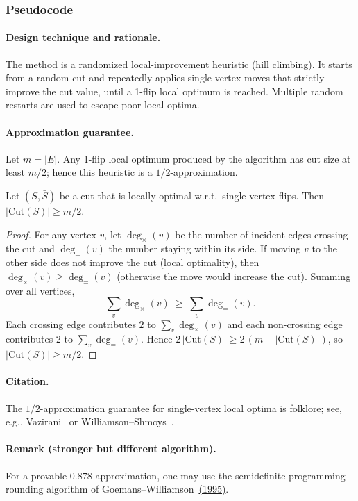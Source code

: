 \documentclass[12pt]{article}
\begin{document}
\subsubsection{Pseudocode}
\paragraph{Design technique and rationale.}
The method is a randomized local-improvement heuristic (hill climbing).
It starts from a random cut and repeatedly applies single-vertex moves that
strictly improve the cut value, until a 1-flip local optimum is reached.
Multiple random restarts are used to escape poor local optima.

\paragraph{Approximation guarantee.}
Let $m=|E|$. Any 1-flip local optimum produced by the algorithm has cut size at least $m/2$; hence this heuristic is a $1/2$-approximation.

\begin{theorem}
Let $(S,\bar S)$ be a cut that is locally optimal w.r.t.\ single-vertex flips.
Then $|\mathrm{Cut}(S)| \ge m/2$.
\end{theorem}

\begin{proof}
For any vertex $v$, let $\deg_{\times}(v)$ be the number of incident edges
crossing the cut and $\deg_{=}(v)$ the number staying within its side.
If moving $v$ to the other side does not improve the cut (local optimality),
then $\deg_{\times}(v)\ge \deg_{=}(v)$ (otherwise the move would increase the cut).
Summing over all vertices,
\[
\sum_v \deg_{\times}(v) \;\ge\; \sum_v \deg_{=}(v).
\]
Each crossing edge contributes $2$ to $\sum_v \deg_{\times}(v)$ and each non-crossing
edge contributes $2$ to $\sum_v \deg_{=}(v)$. Hence $2\,|\mathrm{Cut}(S)| \ge 2\,(m-|\mathrm{Cut}(S)|)$,
so $|\mathrm{Cut}(S)| \ge m/2$.
\end{proof}

\paragraph{Citation.}
The $1/2$-approximation guarantee for single-vertex local optima is folklore;
see, e.g., Vazirani~\cite[§5.3]{Vazirani2001} or Williamson--Shmoys~\cite[Ch.~13]{WilliamsonShmoys2011}.

\paragraph{Remark (stronger but different algorithm).}
For a provable $0.878$-approximation, one may use the semidefinite-programming
rounding algorithm of Goemans–Williamson~\href{https://math.mit.edu/~goemans/PAPERS/maxcut-jacm.pdf}{(1995)}.
\end{document}
